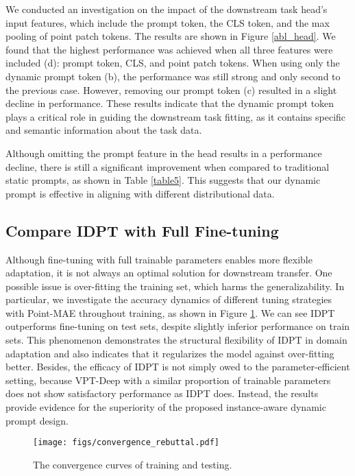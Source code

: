 \documentclass[10pt,twocolumn,letterpaper]{article}
\begin{document}
We conducted an investigation on the impact of the downstream task head's input features, which include the prompt token, the CLS token, and the max pooling of point patch tokens. The results are shown in Figure \ref{abl_head}. We found that the highest performance was achieved when all three features were included (d): prompt token, CLS, and point patch tokens. When using only the dynamic prompt token (b), the performance was still strong and only second to the previous case. However, removing our prompt token (c) resulted in a slight decline in performance. These results indicate that the dynamic prompt token plays a critical role in guiding the downstream task fitting, as it contains specific and semantic information about the task data.


Although omitting the prompt feature in the head results in a performance decline, there is still a significant improvement when compared to traditional static prompts, as shown in Table \ref{table5}. This suggests that our dynamic prompt is effective in aligning with different distributional data.


\subsection{Compare IDPT with Full Fine-tuning} 
Although fine-tuning with full trainable parameters enables more flexible adaptation, 
it is not always an optimal solution for downstream transfer. 
One possible issue is over-fitting the training set, which harms the generalizability. 
In particular, we investigate the accuracy dynamics of different tuning strategies with Point-MAE throughout training, as shown in Figure \ref{reason}. 
We can see IDPT outperforms fine-tuning on test sets, despite slightly inferior performance on train sets. 
This phenomenon demonstrates the structural flexibility of IDPT in domain adaptation and also indicates that it regularizes the model against over-fitting better. 
Besides, the efficacy of IDPT is not simply owed to the parameter-efficient setting, because VPT-Deep with a similar proportion of trainable parameters does not show satisfactory performance as IDPT does. 
Instead, the results provide evidence for the superiority of the proposed instance-aware dynamic prompt design.

\begin{figure}[h]
\centering
\texttt{[image: figs/convergence\_rebuttal.pdf]} 
\caption{The convergence curves of training and testing.
}
\label{reason}
\end{figure}
\end{document}
